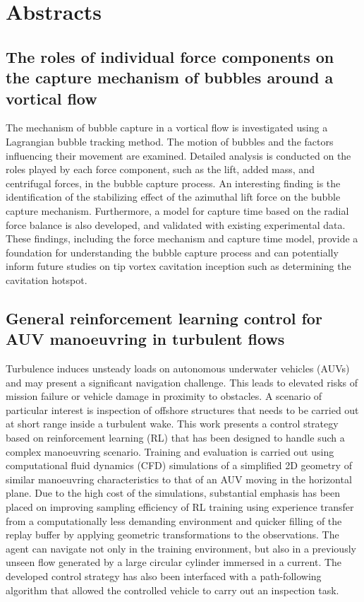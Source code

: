 \documentclass[a4paper,10pt]{article}
\begin{document}
\newpage

\section{Abstracts}

\subsection{The roles of individual force components on the capture mechanism of bubbles around a vortical flow \cite{huang_roles_2024}}

The mechanism of bubble capture in a vortical flow is investigated using a Lagrangian bubble tracking method. The motion of bubbles and the factors influencing their movement are examined. Detailed analysis is conducted on the roles played by each force component, such as the lift, added mass, and centrifugal forces, in the bubble capture process. An interesting finding is the identification of the stabilizing effect of the azimuthal lift force on the bubble capture mechanism. Furthermore, a model for capture time based on the radial force balance is also developed, and validated with existing experimental data. These findings, including the force mechanism and capture time model, provide a foundation for understanding the bubble capture process and can potentially inform future studies on tip vortex cavitation inception such as determining the cavitation hotspot.
	
\subsection{General reinforcement learning control for AUV manoeuvring in turbulent flows \cite{lidtke_general_2024}}

Turbulence induces unsteady loads on autonomous underwater vehicles (AUVs) and may present a significant navigation challenge. This leads to elevated risks of mission failure or vehicle damage in proximity to obstacles. A scenario of particular interest is inspection of offshore structures that needs to be carried out at short range inside a turbulent wake. This work presents a control strategy based on reinforcement learning (RL) that has been designed to handle such a complex manoeuvring scenario. Training and evaluation is carried out using computational fluid dynamics (CFD) simulations of a simplified 2D geometry of similar manoeuvring characteristics to that of an AUV moving in the horizontal plane. Due to the high cost of the simulations, substantial emphasis has been placed on improving sampling efficiency of RL training using experience transfer from a computationally less demanding environment and quicker filling of the replay buffer by applying geometric transformations to the observations. The agent can navigate not only in the training environment, but also in a previously unseen flow generated by a large circular cylinder immersed in a current. The developed control strategy has also been interfaced with a path-following algorithm that allowed the controlled vehicle to carry out an inspection task.
\end{document}
